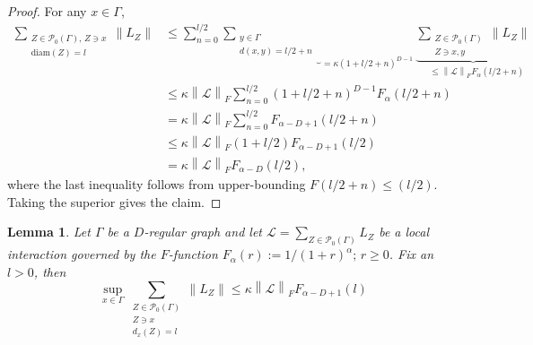 \documentclass[11pt]{article}
\numberwithin{equation}{section}
\numberwithin{figure}{section}
\numberwithin{table}{section}
\theoremstyle{definition}
\theoremstyle{plain}
\newtheorem{lem}[thm]{Lemma}
\theoremstyle{remark}
\newcommand{\Z}{\mathbb{Z}}
\newcommand{\Li}{\mathcal{L}}
\newcommand{\G}{\Gamma}
\newcommand{\norm}[1]{\left\lVert#1\right\rVert}
\newcommand{\normm}[2]{\left\lVert#1\right\rVert_{#2}}
\begin{document}
\begin{proof}For any $x\in \G$,
\begin{equation}
\begin{aligned}
\sum_{\substack{
    Z\in\mathcal{P}_0(\Gamma),\, Z\ni x \\
    \mathrm{diam}(Z)= l
}}
\norm{L_Z}
&\leq
\sum_{n=0}^{l/2}
\underbrace{
    \sum_{\substack{
        y\in\G \\
        d(x,y)=l/2+n
    }}
}_{=\kappa (1+l/2+n)^{D-1}}
\underbrace{
    \sum_{\substack{
        Z\in\mathcal{P}_0(\Gamma) \\
        Z\ni x,y
    }}
    \norm{L_Z}
}_{\;\;\;\leq \normm{\Li}{F} F_\alpha (l/2+n)}
\\
&\leq
\kappa \normm{\Li}{F}
\sum_{n=0}^{l/2}
(1+l/2+n)^{D-1}
F_\alpha (l/2+n)
\\
&=
\kappa \normm{\Li}{F}
\sum_{n=0}^{l/2}
F_{\alpha -D+1}(l/2+n)
\\
&\leq
\kappa \normm{\Li}{F}
(1+l/2)
F_{\alpha-D+1}(l/2)
\\
&=
\kappa \normm{\Li}{F}
F_{\alpha -D}(l/2),
\end{aligned}
\end{equation}
where the last inequality follows from upper-bounding $F(l/2+n)\leq (l/2)$. Taking the superior gives the claim.
\end{proof}
\begin{lem}\label{lem:technicalLemmaFfunction2}
    Let $\Gamma$ be a $D$-regular graph and let $\Li=\sum_{Z\in\mathcal{P}_0(\Gamma)}L_Z$ be a local interaction governed by the $F$-function $F_\alpha(r) :=1/(1+r)^\alpha;\,r\geq0$. Fix an $l>0$, then
    \begin{equation}
    \sup_{x\in\G}\sum\limits_{\substack{Z\in\mathcal{P}_0(\Gamma)\\ Z\ni x  \\ d_x(Z)= l}}\norm{L_Z}\leq \kappa \normm{\Li}{F} F_{\alpha -D+1}(l)
    \end{equation}
\end{lem}
\end{document}
